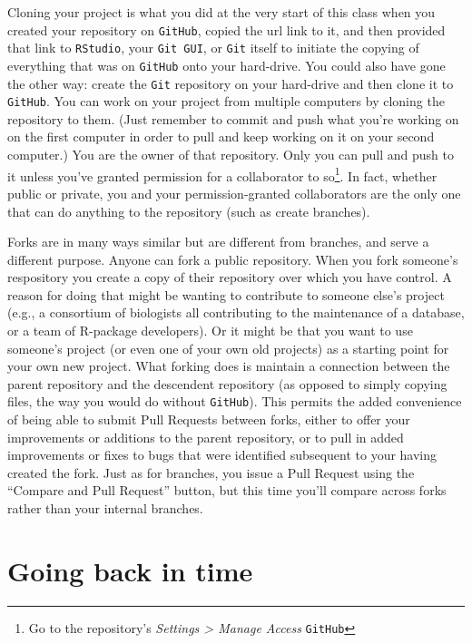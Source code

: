 \documentclass[12pt,letterpaper]{article}
\begin{document}
Cloning your project is what you did at the very start of this class when you created your repository on \texttt{GitHub}, copied the url link to it, and then provided that link to \texttt{RStudio}, your \texttt{Git GUI}, or \texttt{Git} itself to initiate the copying of everything that was on \texttt{GitHub} onto your hard-drive.
You could also have gone the other way:  create the \texttt{Git} repository on your hard-drive and then clone it to \texttt{GitHub}.
You can work on your project from multiple computers by cloning the repository to them.
(Just remember to commit and push what you're working on on the first computer in order to pull and keep working on it on your second computer.)
You are the owner of that repository.
Only you can pull and push to it unless you've granted permission for a collaborator to so\footnote{Go to the repository's \emph{Settings > Manage Access} \texttt{GitHub}}.
In fact, whether public or private, you and your permission-granted collaborators are the only one that can do anything to the repository (such as create branches).

Forks are in many ways similar but are different from branches, and serve a different purpose.
Anyone can fork a public repository.
When you fork someone's respository you create a copy of their repository over which you have control.
A reason for doing that might be wanting to contribute to someone else's project (e.g., a consortium of biologists all contributing to the maintenance of a database, or a team of R-package developers).
Or it might be that you want to use someone's project (or even one of your own old projects) as a starting point for your own new project.
What forking does is maintain a connection between the parent repository and the  descendent repository (as opposed to simply copying files, the way you would do without \texttt{GitHub}).
This permits the added convenience of being able to submit Pull Requests between forks, either to offer your improvements or additions to the parent repository, or to pull in added improvements or fixes to bugs that were identified subsequent to your having created the fork.
Just as for branches, you issue a Pull Request using the ``Compare and Pull Request'' button, but this time you'll compare across forks rather than your internal branches.



\section{Going back in time}
\end{document}
